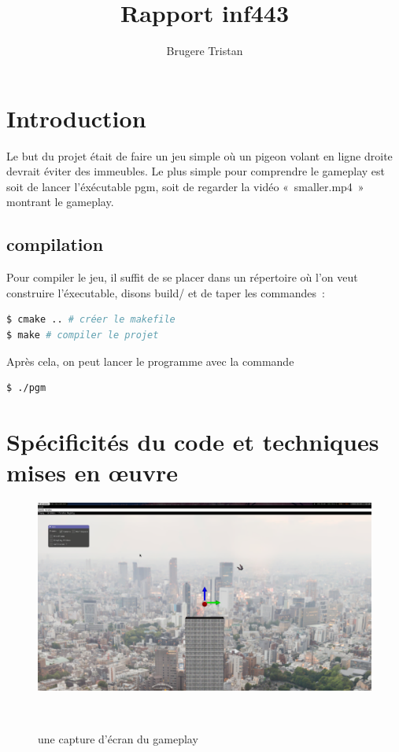 \documentclass[a4paper,12pt]{article}
\begin{document}
\title{Rapport inf443}
\author{Brugere Tristan}
\maketitle
\tableofcontents{}


\section{Introduction}
Le but du projet était de faire un jeu simple où un pigeon volant en ligne droite devrait éviter des immeubles.
Le plus simple pour comprendre le gameplay est soit de lancer l’éxécutable pgm, soit de regarder la vidéo « smaller.mp4 » montrant le gameplay.

\subsection{compilation}
Pour compiler le jeu, il suffit de se placer dans un répertoire où l’on veut construire l’éxecutable, disons build/
et de taper les commandes : 
\begin{lstlisting}[language=bash]
$ cmake .. # créer le makefile
$ make # compiler le projet
\end{lstlisting}

Après cela, on peut lancer le programme avec la commande

\begin{lstlisting}[language=bash]
$ ./pgm
\end{lstlisting}

\section{Spécificités du code et techniques mises en œuvre}

\begin{figure}[h]
  \centering
    \includegraphics[width=\textwidth]{screenshot.png}
  \caption{une capture d’écran du gameplay}~\label{fig:bars1}
\end{figure}
\end{document}
